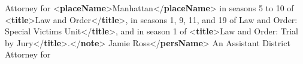 \begin{shaded}
\hspace*{1em}\hspace*{1em}\hspace*{1em}\hspace*{1em}\hspace*{1em}\hspace*{1em} Attorney for {<\textbf{placeName}>}Manhattan{</\textbf{placeName}>} in seasons 5 to 10\mbox{}\newline 
\hspace*{1em}\hspace*{1em}\hspace*{1em}\hspace*{1em}\hspace*{1em}\hspace*{1em} of {<\textbf{title}>}Law and Order{</\textbf{title}>}, in seasons 1, 9, 11, and 19 of\mbox{}\newline 
\hspace*{1em}\hspace*{1em}Law and Order: Special Victims Unit{</\textbf{title}>}, and in\mbox{}\newline 
\hspace*{1em}\hspace*{1em}\hspace*{1em}\hspace*{1em}\hspace*{1em}\hspace*{1em} season 1 of {<\textbf{title}>}Law and Order: Trial by Jury{</\textbf{title}>}.{</\textbf{note}>}\mbox{}\newline 
\hspace*{1em}\mbox{}\newline 
\hspace*{1em}\mbox{}\newline 
\hspace*{1em}\hspace*{1em}Jamie Ross{</\textbf{persName}>}\mbox{}\newline 
\hspace*{1em}\hspace*{1em}An Assistant District Attorney for\mbox{}\newline 

\end{shaded}
